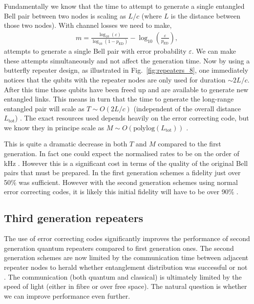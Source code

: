 Fundamentally we know that the time to attempt to generate a single entangled Bell pair between two nodes is scaling as $L/c$ (where $L$ is the distance between those two nodes). With channel losses we need to make,
\begin{align}
m=\frac{\log_{10} (\varepsilon)}{\log_{10} (1-p_\mathrm{ED})} - \log_{10} \left(\frac{\varepsilon}{p_\mathrm{ED}}\right),
\end{align}
attempts to generate a single Bell pair with error probability $\varepsilon$. We can make these attempts simultaneously and not affect the generation time. Now by using a butterfly repeater design, as illustrated in Fig.~\ref{fig:repeaters_8}, one immediately notices that the qubits with the repeater nodes are only used for duration $\sim 2 L/c$. After this time those qubits have been freed up and are available to generate new entangled links. This means in turn that the time to generate the long-range entangled pair will scale as \mbox{$T\sim O(2L/c)$} (independent of the overall distance $L_\mathrm{tot}$) \cite{bib:jiang09, bib:munro10, bib:Muralidharan2016}. The exact resources used depends heavily on the error correcting code, but we know they in principe scale as \mbox{$M \sim O(\mathrm{polylog}(L_\mathrm{tot}))$} \cite{bib:Muralidharan2016}.

This is quite a dramatic decrease in both $T$ and $M$ compared to the first generation. In fact one could expect the normalised rates to be on the order of kHz \cite{bib:munro10}. However this is a significant cost in terms of the quality of the original Bell pairs that must be prepared. In the first generation schemes a fidelity just over 50\% was sufficient. However with the second generation schemes using normal error correcting codes, it is likely this initial fidelity will have to be over 90\% \cite{bib:jiang09, bib:munro10}. 

\subsection{Third generation repeaters}

The use of error correcting codes significantly improves the performance of second generation quantum repeaters compared to first generation ones. The second generation schemes are now limited by the communication time between adjacent repeater nodes to herald whether entanglement distribution was successful or not \cite{bib:munro10, bib:munro12}. The communication (both quantum and classical) is ultimately limited by the speed of light (either in fibre or over free space). The natural question is whether we can improve performance even further.

